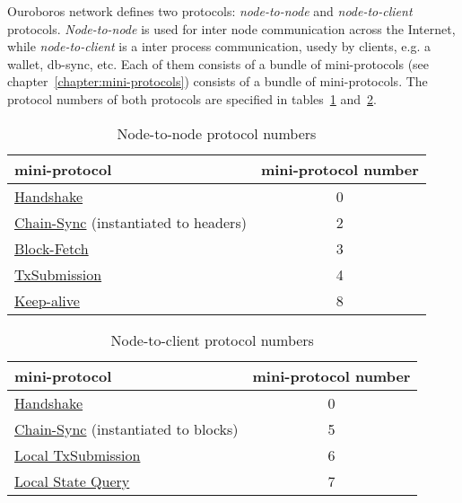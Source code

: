 Ouroboros network defines two protocols: \emph{node-to-node} and
\emph{node-to-client} protocols.  \emph{Node-to-node} is used for inter node
communication across the Internet, while \emph{node-to-client} is a inter
process communication, usedy by clients, e.g. a wallet, db-sync, etc.  Each of them consists of a bundle of mini-protocols (see chapter~\ref{chapter:mini-protocols})
consists of a bundle of mini-protocols.  The protocol numbers of both protocols
are specified in tables~\ref{table:node-to-node-protocol-numbers}
and~\ref{table:node-to-client-protocol-numbers}.
\begin{table}[ht]
  \begin{center}
    \begin{tabular}{l|c}
      mini-protocol                                                      & mini-protocol number \\\hline
      \hyperref[handshake-protocol]{Handshake}                           & 0  \\
      \hyperref[chain-sync-protocol]{Chain-Sync} \small{(instantiated to headers)} & 2  \\
      \hyperref[block-fetch-protocol]{Block-Fetch}                       & 3  \\
      \hyperref[tx-submission-protocol]{TxSubmission}                    & 4  \\
      \hyperref[keep-alive-protocol]{Keep-alive}                         & 8  \\
    \end{tabular}
  \end{center}
  \caption{Node-to-node protocol numbers}
  \label{table:node-to-node-protocol-numbers}
\end{table}
\begin{table}[ht]
  \begin{center}
    \begin{tabular}{l|c}
      mini-protocol                                                     & mini-protocol number \\\hline
      \hyperref[handshake-protocol]{Handshake}                          & 0 \\
      \hyperref[chain-sync-protocol]{Chain-Sync} \small{(instantiated to blocks)} & 5 \\
      \hyperref[local-tx-submission-protocol]{Local TxSubmission}       & 6 \\
      \hyperref[local-state-query-protocol]{Local State Query}          & 7 \\
    \end{tabular}
  \end{center}
  \caption{Node-to-client protocol numbers}
  \label{table:node-to-client-protocol-numbers}
\end{table}
